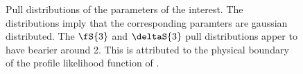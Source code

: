 \begin{figure}[!h]
\begin{subfigure}{0.5\textwidth}
    \scalebox{0.60}{}
    \caption{}
    \label{pull_ASMag2_bin4}
  \end{subfigure}%
  \hfill%
  \begin{subfigure}{0.5\textwidth}
    \scalebox{0.60}{}
    \caption{}
    \label{pull_ASPhase_bin4}
  \end{subfigure}
\caption{Pull distributions of the parameters of the \swave interest. The distributions imply that the corresponding paramters are gaussian distributed.
         The $\fS{3}$ and $\deltaS{3}$ pull distributions apper to have bearier around 2. This is attributed to the physical boundary of the profile 
         likelihood function of .}
\label{pull_swave}
\end{figure}

